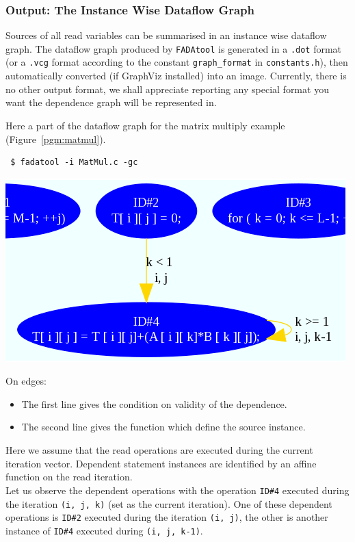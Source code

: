 \subsubsection{Output: The Instance Wise Dataflow Graph}
Sources of all read variables can be summarised in an instance wise dataflow graph. The dataflow graph produced by \verb|FADAtool| is generated in a \verb|.dot| format (or a \verb|.vcg| format according to the constant \verb|graph_format| in \verb|constants.h|), then automatically converted (if GraphViz installed) into an image. Currently, there is no other output format, we shall appreciate reporting any special format you want the dependence graph will be represented in. 

Here a part of the dataflow graph for the matrix multiply example (Figure~\ref{pgm:matmul}).
\begin{verbatim}
 $ fadatool -i MatMul.c -gc
\end{verbatim}

\begin{center}
 \includegraphics[scale=0.6]{MatMul_DFG.png}
 \end{center}

On edges:
\begin{itemize}
 \item The first line gives the condition on validity of the dependence.
 \item The second line gives the function which define the source instance.
\end{itemize}

Here we assume that the read operations are executed during the current iteration vector. Dependent statement instances are identified by an affine function on the read iteration.\\
Let us observe the dependent operations with the operation \verb|ID#4| executed during the iteration \verb|(i, j, k)| (set as the current iteration). One of these dependent operations is \verb|ID#2| executed during the iteration \verb|(i, j)|, the other is another instance of \verb|ID#4| executed during \verb|(i, j, k-1)|.

